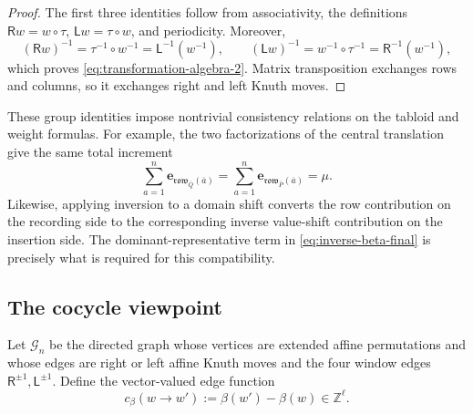 \documentclass[11pt]{article}
\theoremstyle{definition}
\theoremstyle{remark}
\newcommand{\Z}{\mathbb Z}
\newcommand{\ol}[1]{\overline{#1}}
\newcommand{\row}{\mathfrak{row}}
\newcommand{\e}{\mathbf e}
\newcommand{\Rop}{\mathsf R}
\newcommand{\Lop}{\mathsf L}
\begin{document}
\begin{proof}
The first three identities follow from associativity, the definitions
\(\Rop w=w\circ\tau\), \(\Lop w=\tau\circ w\), and periodicity.  Moreover,
\[
 (\Rop w)^{-1}=\tau^{-1}\circ w^{-1}=\Lop^{-1}(w^{-1}),
 \qquad
 (\Lop w)^{-1}=w^{-1}\circ\tau^{-1}=\Rop^{-1}(w^{-1}),
\]
which proves \eqref{eq:transformation-algebra-2}.  Matrix transposition exchanges rows
and columns, so it exchanges right and left Knuth moves.
\end{proof}

These group identities impose nontrivial consistency relations on the tabloid and weight
formulas.  For example, the two factorizations of the central translation give the same
total increment
\[
 \sum_{a=1}^{n}\e_{\row_{\bar Q}(\ol a)}
 =\sum_{a=1}^{n}\e_{\row_{\bar P}(\ol a)}=\mu.
\]
Likewise, applying inversion to a domain shift converts the row contribution on the
recording side to the corresponding inverse value-shift contribution on the insertion
side.  The dominant-representative term in \eqref{eq:inverse-beta-final} is precisely
what is required for this compatibility.

\subsection{The cocycle viewpoint}\label{subsec:cocycle}

Let \(\mathcal G_n\) be the directed graph whose vertices are extended affine
permutations and whose edges are right or left affine Knuth moves and the four window
edges \(\Rop^{\pm1},\Lop^{\pm1}\).  Define the vector-valued edge function
\begin{equation}\label{eq:beta-cocycle}
 c_\beta(w\to w'):=\beta(w')-\beta(w)\in\Z^\ell.
\end{equation}
\end{document}
